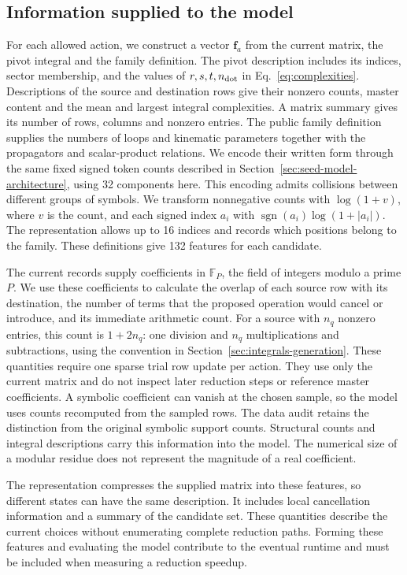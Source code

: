 \subsection{Information supplied to the model}
For each allowed action, we construct a vector $\boldsymbol f_a$ from
the current matrix, the pivot integral and the family definition.
The pivot description includes its indices, sector membership, and
the values of $r,s,t,n_{\rm dot}$ in Eq.~\eqref{eq:complexities}.
Descriptions of the source and destination rows give their nonzero
counts, master content and the mean and largest integral complexities.
A matrix summary gives its number of rows, columns and nonzero entries.
The public family definition supplies the numbers of loops and
kinematic parameters together with the propagators and scalar-product
relations. We encode their written form through the same fixed signed
token counts described in Section~\ref{sec:seed-model-architecture},
using 32 components here. This encoding admits collisions between
different groups of symbols. We transform nonnegative counts with
$\log(1+v)$, where $v$ is the count, and each signed index $a_i$ with
$\operatorname{sgn}(a_i)\log(1+|a_i|)$. The representation allows up to
16 indices and records which positions belong to the family.
These definitions give 132 features for each candidate.

The current records supply coefficients in $\mathbb F_P$, the field
of integers modulo a prime $P$. We use these coefficients to calculate
the overlap of each source row with its destination, the number of
terms that the proposed operation would cancel or introduce, and its
immediate arithmetic count. For a source with $n_q$ nonzero entries,
this count is $1+2n_q$: one division and $n_q$ multiplications and
subtractions, using the convention in
Section~\ref{sec:integrals-generation}. These quantities require one
sparse trial row update per action. They use only the current matrix
and do not inspect later reduction steps or reference master
coefficients.
A symbolic coefficient can vanish at the chosen sample, so the model
uses counts recomputed from the sampled rows. The data audit retains
the distinction from the original symbolic support counts. Structural
counts and integral descriptions carry this information into the model.
The numerical size of a modular residue does not represent the
magnitude of a real coefficient.

The representation compresses the supplied matrix into these features,
so different states can have the same description. It includes local
cancellation information and a summary of the candidate set. These
quantities describe the current choices without enumerating complete
reduction paths. Forming these features and evaluating the model
contribute to the eventual runtime
and must be included when measuring a reduction speedup.

